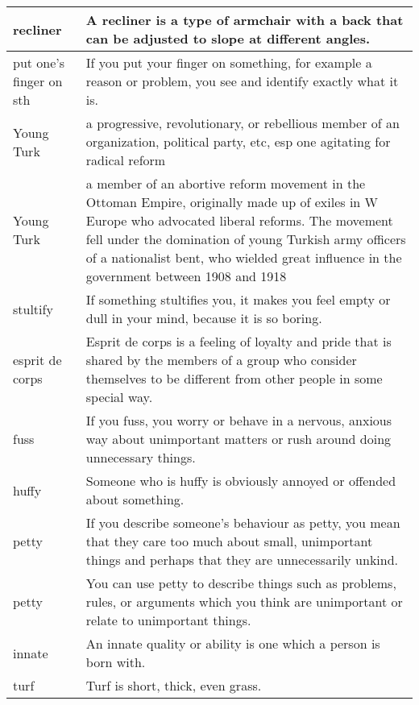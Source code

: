 \documentclass{article}
\begin{document}
\begin{center}
\begin{longtable}{|l|p{9cm}|}
\hline
recliner
&
A recliner is a type of armchair with a back that can be adjusted to slope at different angles.
\\

\hline
put one's finger on sth
&
If you put your finger on something, for example a reason or problem, you see and identify exactly what it is.
\\

\hline
Young Turk
&
a progressive, revolutionary, or rebellious member of an organization, political party, etc, esp one agitating for radical reform
\\

\hline
Young Turk
&
a member of an abortive reform movement in the Ottoman Empire, originally made up of exiles in W Europe who advocated liberal reforms. The movement fell under the domination of young Turkish army officers of a nationalist bent, who wielded great influence in the government between 1908 and 1918
\\

\hline
stultify
&
If something stultifies you, it makes you feel empty or dull in your mind, because it is so boring.
\\

\hline
esprit de corps
&
Esprit de corps is a feeling of loyalty and pride that is shared by the members of a group who consider themselves to be different from other people in some special way.
\\

\hline
fuss
&
If you fuss, you worry or behave in a nervous, anxious way about unimportant matters or rush around doing unnecessary things.
\\

\hline
huffy
&
Someone who is huffy is obviously annoyed or offended about something.
\\

\hline
petty
&
If you describe someone's behaviour as petty, you mean that they care too much about small, unimportant things and perhaps that they are unnecessarily unkind.
\\

\hline
petty
&
You can use petty to describe things such as problems, rules, or arguments which you think are unimportant or relate to unimportant things.
\\

\hline
innate
&
An innate quality or ability is one which a person is born with.
\\

\hline
turf
&
Turf is short, thick, even grass.
\\


\end{longtable}
\end{center}
\end{document}
